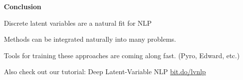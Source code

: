 \documentclass[aspectratio=169]{beamer}
\let\tempone\itemize
\let\temptwo\enditemize
\renewenvironment{itemize}{\tempone\addtolength{\itemsep}{0.5\baselineskip}}{\temptwo}
\newcommand{\thetitle}[1]{{\begin{center}\textbf{{#1}}\end{center}}}
\newcommand{\air}{\vspace{0.25cm}}
\begin{document}
\begin{frame}
  \thetitle{Conclusion}
  \begin{itemize}
  \item Discrete latent variables are a natural fit for NLP
    \air
  \item Methods can be integrated naturally into many problems.
    \air
  \item Tools for training these approaches are coming along fast. (Pyro, Edward, etc.)
    \air

  \item Also check out our tutorial: Deep Latent-Variable NLP
    \url{bit.do/lvnlp}

  \end{itemize}
\end{frame}
\end{document}
